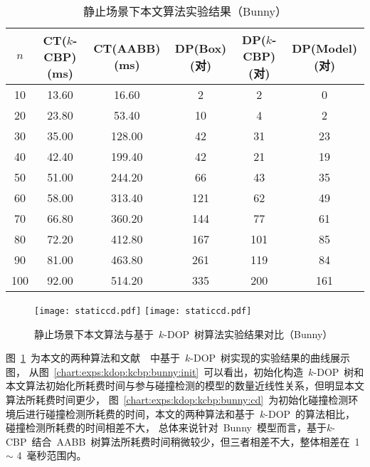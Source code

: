 \begin{table}[htbp]  
\centering
\caption{静止场景下本文算法实验结果（Bunny）}
\label{tab:exp:bunny:k24:kdop:kcbp:detail}
\begin{tabular}{cccccc}
\toprule[1.5pt]
$n$ & CT($k$-CBP)(ms) &  CT(AABB)(ms) & DP(Box)(对) & DP($k$-CBP)(对) & DP(Model)(对)\\
\midrule[1.0pt]
10 &  13.60 &	16.60      & 2   &2   & 0  \\
20 &  23.80 &	53.40      & 10  &4   & 2  \\
30 &  35.00 &	128.00     & 42  &31  & 23 \\
40 &  42.40 &	199.40     & 42  &21  & 19 \\
50 &  51.00 &	244.20     & 66  &43  & 35 \\
60 &  58.00 &	313.40     & 121 &62  & 49 \\
70 &  66.80 &	360.20     & 144 &77  & 61 \\
80 &  72.20 &	412.80     & 167 &101 & 85 \\
90 &  81.00 &	463.80     & 261 &119 & 84 \\
100&  92.00 &	514.20     & 335 &200 & 161\\
\bottomrule[1.5pt]
\end{tabular}
\end{table}

\begin{figure}[!ht] 
\centering
{}
{
    \texttt{[image: staticcd.pdf]}
}
\hspace{1em}
{  
   \texttt{[image: staticcd.pdf]}
}
\caption{静止场景下本文算法与基于~$k$-DOP~树算法实验结果对比（Bunny）}
\label{chart:exps:kdop:kcbp:bunny}
\end{figure}

图~\ref{chart:exps:kdop:kcbp:bunny}~为本文的两种算法和文献~~中基于~$k$-DOP~树实现的实验结果的曲线展示图，
从图~\ref{chart:exps:kdop:kcbp:bunny:init}~可以看出，初始化构造~$k$-DOP~树和本文算法初始化所耗费时间与参与碰撞检测的模型的数量近线性关系，但明显本文算法所耗费时间更少，
图~\ref{chart:exps:kdop:kcbp:bunny:cd}~为初始化碰撞检测环境后进行碰撞检测所耗费的时间，本文的两种算法和基于~$k$-DOP~的算法相比，碰撞检测所耗费的时间相差不大，
总体来说针对~Bunny~模型而言，基于$k$-CBP~结合~AABB~树算法所耗费时间稍微较少，但三者相差不大，整体相差在~1 $\sim$ 4~毫秒范围内。

